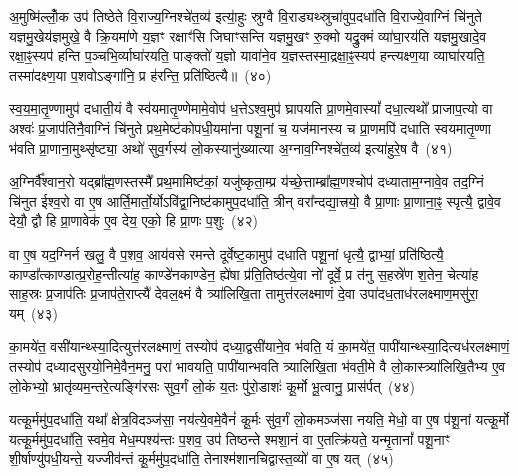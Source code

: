 अ॒मुष्मि॑ल्लोँ॒क उप॑ तिष्ठेते वि॒राज्य॒ग्निश्चे॑त॒व्य॑ इत्या॒॑हुः स्रुग्वै वि॒राड्यथ्स्रुचा॑वुप॒दधा॑ति वि॒राज्ये॒वाग्निं चि॑नुते यज्ञमु॒खेय॑ज्ञमुखे॒ वै क्रि॒यमा॑णे य॒ज्ञꣳ रक्षाꣳ॑सि जिघाꣳसन्ति यज्ञमु॒खꣳ रु॒क्मो यद्रु॒क्मं व्या॑घा॒रय॑ति यज्ञमु॒खादे॒व रक्षा॒ꣴ॒स्यप॑ हन्ति प॒ञ्चभि॒र्व्याघा॑रयति॒ पाङ्क्तो॑ य॒ज्ञो यावा॑ने॒व य॒ज्ञस्तस्मा॒द्रक्षा॒ꣴ॒स्यप॑ हन्त्यक्ष्ण॒या व्याघा॑रयति॒ तस्मा॑दक्ष्ण॒या प॒शवो\-ऽङ्गा॑नि॒ प्र ह॑रन्ति॒ प्रति॑ष्ठित्यै॥~(४०)

{\anuvakamend[{वन॒स्पत॑यो दक्षिण॒तो ध॑त्त एन॒न्तस्मा॑दक्ष्ण॒या पञ्च॑ च}]}%

स्व॒य॒मा॒तृ॒ण्णामुप॑ दधाती॒यं वै स्व॑यमातृ॒ण्णेमामे॒वोप॑ ध॒त्ते\-ऽश्व॒मुप॑ घ्रापयति प्रा॒णमे॒वास्यां᳚ दधा॒त्यथो᳚ प्राजाप॒त्यो वा अश्वः॑ प्र॒जाप॑तिनै॒वाग्निं चि॑नुते प्रथ॒मेष्ट॑कोपधी॒यमा॑ना पशू॒नां च॒ यज॑मानस्य च प्रा॒णमपि॑ दधाति स्वयमातृ॒ण्णा भ॑वति प्रा॒णाना॒मुथ्सृ॑ष्ट्या॒ अथो॑ सुव॒र्गस्य॑ लो॒कस्यानु॑ख्यात्या अ॒ग्नाव॒ग्निश्चे॑त॒व्य॑ इत्या॑हुरे॒ष वै~(४१)

अ॒ग्निर्वै᳚श्वान॒रो यद्ब्रा᳚ह्म॒णस्तस्मै᳚ प्रथ॒मामिष्ट॑कां॒ यजु॑ष्कृता॒म्प्र य॑च्छे॒त्ताम्ब्रा᳚ह्म॒णश्चोप॑ दध्याताम॒ग्नावे॒व तद॒ग्निं चि॑नुत ईश्व॒रो वा ए॒ष आर्ति॒मार्तो॒र्यो\-ऽवि॑द्वा॒निष्ट॑कामुप॒दधा॑ति॒ त्रीन् वरा᳚न्दद्या॒त्त्रयो॒ वै प्रा॒णाः प्रा॒णाना॒ꣴ॒ स्पृत्यै॒ द्वावे॒व देयौ॒ द्वौ हि प्रा॒णावेक॑ ए॒व देय॒ एको॒ हि प्रा॒णः प॒शुः~(४२)

वा ए॒ष यद॒ग्निर्न खलु॒ वै प॒शव॒ आय॑वसे रमन्ते दूर्वेष्ट॒कामुप॑ दधाति पशू॒नां धृत्यै॒ द्वाभ्यां॒ प्रति॑ष्ठित्यै॒ काण्डा᳚त्काण्डात्प्र॒रोह॒न्तीत्या॑ह॒ काण्डे॑नकाण्डेन॒ ह्ये॑षा प्र॑ति॒तिष्ठ॑त्ये॒वा नो॑ दूर्वे॒ प्र त॑नु स॒हस्रे॑ण श॒तेन॒ चेत्या॑ह साह॒स्रः प्र॒जाप॑तिः प्र॒जाप॑ते॒राप्त्यै॑ देवल॒क्ष्मं वै त्र्या॑लिखि॒ता तामुत्त॑रलक्ष्माणं दे॒वा उपा॑दध॒ताध॑रलक्ष्माण॒मसु॑रा॒ यम्~(४३)

का॒मये॑त॒ वसी॑यान्थ्स्या॒दित्युत्त॑रलक्ष्माणं॒ तस्योप॑ दध्या॒द्वसी॑याने॒व भ॑वति॒ यं का॒मये॑त॒ पापी॑यान्थ्स्या॒दित्यध॑र\-लक्ष्माणं॒ तस्योप॑ दध्यादसुरयो॒निमे॒वैन॒मनु॒ परा॑ भावयति॒ पापी॑यान्भवति त्र्यालिखि॒ता भ॑वती॒मे वै लो॒का\-स्त्र्या॑लिखि॒तैभ्य ए॒व लो॒केभ्यो॒ भ्रातृ॑व्यम॒न्तरे॒त्यङ्गि॑रसः सुव॒र्गं लो॒कं य॒तः पु॑रो॒डाशः॑ कू॒र्मो भू॒त्वानु॒ प्रास॑र्पत्~(४४)

यत्कू॒र्ममु॑प॒दधा॑ति॒ यथा᳚ क्षेत्र॒विदञ्ज॑सा॒ नय॑त्ये॒वमे॒वैनं॑ कू॒र्मः सु॑व॒र्गं लो॒कमञ्ज॑सा नयति॒ मेधो॒ वा ए॒ष प॑शू॒नां यत्कू॒र्मो यत्कू॒र्ममु॑प॒दधा॑ति॒ स्वमे॒व मेध॒म्पश्य॑न्तः प॒शव॒ उप॑ तिष्ठन्ते श्मशा॒नं वा ए॒तत्क्रि॑यते॒ यन्मृ॒तानां᳚ पशू॒नाꣳ शी॒र्\mbox{}षाण्यु॑पधी॒यन्ते॒ यज्जीव॑न्तं कू॒र्ममु॑प॒दधा॑ति॒ तेनाश्म॑शानचिद्वास्त॒व्यो॑ वा ए॒ष यत्~(४५)

